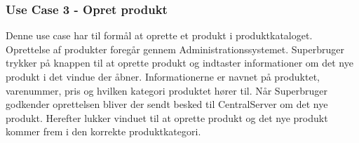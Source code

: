 \subsubsection{Use Case 3 - Opret produkt}
Denne use case har til formål at oprette et produkt i produktkataloget. Oprettelse af produkter foregår gennem Administrationssystemet. Superbruger trykker på knappen til at oprette produkt og indtaster informationer om det nye produkt i det vindue der åbner. Informationerne er navnet på produktet, varenummer, pris og hvilken kategori produktet hører til. Når Superbruger godkender oprettelsen bliver der sendt besked til CentralServer om det nye produkt. Herefter lukker vinduet til at oprette produkt og det nye produkt kommer frem i den korrekte produktkategori.
